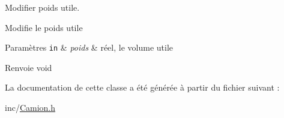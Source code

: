 Modifier poids utile. 

Modifie le poids utile


\begin{DoxyParams}[1]{Paramètres}
\mbox{\tt in}  & {\em poids} & réel, le volume utile \\
\hline
\end{DoxyParams}
\begin{DoxyReturn}{Renvoie}
void 
\end{DoxyReturn}


La documentation de cette classe a été générée à partir du fichier suivant :\begin{DoxyCompactItemize}
\item 
inc/\hyperlink{_camion_8h}{Camion.h}\end{DoxyCompactItemize}

